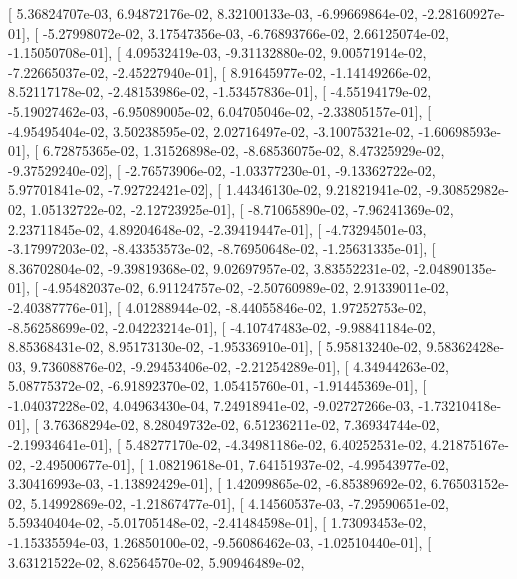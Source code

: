 \documentclass{article}
\begin{document}
       [  5.36824707e-03,   6.94872176e-02,   8.32100133e-03,
         -6.99669864e-02,  -2.28160927e-01],
       [ -5.27998072e-02,   3.17547356e-03,  -6.76893766e-02,
          2.66125074e-02,  -1.15050708e-01],
       [  4.09532419e-03,  -9.31132880e-02,   9.00571914e-02,
         -7.22665037e-02,  -2.45227940e-01],
       [  8.91645977e-02,  -1.14149266e-02,   8.52117178e-02,
         -2.48153986e-02,  -1.53457836e-01],
       [ -4.55194179e-02,  -5.19027462e-03,  -6.95089005e-02,
          6.04705046e-02,  -2.33805157e-01],
       [ -4.95495404e-02,   3.50238595e-02,   2.02716497e-02,
         -3.10075321e-02,  -1.60698593e-01],
       [  6.72875365e-02,   1.31526898e-02,  -8.68536075e-02,
          8.47325929e-02,  -9.37529240e-02],
       [ -2.76573906e-02,  -1.03377230e-01,  -9.13362722e-02,
          5.97701841e-02,  -7.92722421e-02],
       [  1.44346130e-02,   9.21821941e-02,  -9.30852982e-02,
          1.05132722e-02,  -2.12723925e-01],
       [ -8.71065890e-02,  -7.96241369e-02,   2.23711845e-02,
          4.89204648e-02,  -2.39419447e-01],
       [ -4.73294501e-03,  -3.17997203e-02,  -8.43353573e-02,
         -8.76950648e-02,  -1.25631335e-01],
       [  8.36702804e-02,  -9.39819368e-02,   9.02697957e-02,
          3.83552231e-02,  -2.04890135e-01],
       [ -4.95482037e-02,   6.91124757e-02,  -2.50760989e-02,
          2.91339011e-02,  -2.40387776e-01],
       [  4.01288944e-02,  -8.44055846e-02,   1.97252753e-02,
         -8.56258699e-02,  -2.04223214e-01],
       [ -4.10747483e-02,  -9.98841184e-02,   8.85368431e-02,
          8.95173130e-02,  -1.95336910e-01],
       [  5.95813240e-02,   9.58362428e-03,   9.73608876e-02,
         -9.29453406e-02,  -2.21254289e-01],
       [  4.34944263e-02,   5.08775372e-02,  -6.91892370e-02,
          1.05415760e-01,  -1.91445369e-01],
       [ -1.04037228e-02,   4.04963430e-04,   7.24918941e-02,
         -9.02727266e-03,  -1.73210418e-01],
       [  3.76368294e-02,   8.28049732e-02,   6.51236211e-02,
          7.36934744e-02,  -2.19934641e-01],
       [  5.48277170e-02,  -4.34981186e-02,   6.40252531e-02,
          4.21875167e-02,  -2.49500677e-01],
       [  1.08219618e-01,   7.64151937e-02,  -4.99543977e-02,
          3.30416993e-03,  -1.13892429e-01],
       [  1.42099865e-02,  -6.85389692e-02,   6.76503152e-02,
          5.14992869e-02,  -1.21867477e-01],
       [  4.14560537e-03,  -7.29590651e-02,   5.59340404e-02,
         -5.01705148e-02,  -2.41484598e-01],
       [  1.73093453e-02,  -1.15335594e-03,   1.26850100e-02,
         -9.56086462e-03,  -1.02510440e-01],
       [  3.63121522e-02,   8.62564570e-02,   5.90946489e-02,
\end{document}
